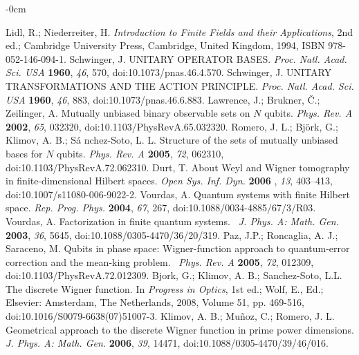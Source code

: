 \documentclass[quantumrep,article,submit,pdftex,moreauthors]{Definitions/mdpi}
\begin{document}
\begin{adjustwidth}{-\extralength}{0cm}
\begin{thebibliography}{999}
 Lidl, R.; Niederreiter, H. \textit{Introduction to Finite
Fields and their Applications}, 2nd ed.; Cambridge University Press,
Cambridge, United Kingdom, 1994, ISBN 978-052-146-094-1.
 Schwinger, J. UNITARY OPERATOR BASES. \textit{Proc.
Natl. Acad. Sci. USA} \textbf{1960}, \textit{46}, 570,
doi:10.1073/pnas.46.4.570.
 Schwinger, J. UNITARY TRANSFORMATIONS AND THE ACTION
PRINCIPLE. \textit{Proc. Natl. Acad. Sci. USA} \textbf{1960}, \textit{46},
883, doi:10.1073/pnas.46.6.883.
 Lawrence, J.; Brukner, \v{C}.; Zeilinger, A. Mutually
unbiased binary observable sets on $N$ qubits. \textit{Phys. Rev. A} \textbf{%
2002}, \textit{65}, 032320, doi:10.1103/PhysRevA.65.032320.
 Romero, J. L.; Bj\"{o}rk, G.; Klimov, A. B.; S\'{a}%
nchez-Soto, L. L. Structure of the sets of mutually unbiased bases for $N$
qubits. \textit{Phys. Rev. A} \textbf{2005}, \textit{72}, 062310,
doi:10.1103/PhysRevA.72.062310.
 Durt, T. About Weyl and Wigner tomography in
finite-dimensional Hilbert spaces. \textit{Open Sys. Inf. Dyn.} \textbf{2006}%
, \textit{13}, 403--413, doi:10.1007/s11080-006-9022-2.
 Vourdas, A. Quantum systems with finite Hilbert space. 
\textit{Rep. Prog. Phys.} \textbf{2004}, \textit{67}, 267,
doi:10.1088/0034-4885/67/3/R03.
 Vourdas, A. Factorization in finite quantum systems. 
\textit{\ J. Phys. A: Math. Gen.} \textbf{2003}, \textit{36}, 5645,
doi:10.1088/0305-4470/36/20/319.
 Paz, J.P.; Roncaglia, A. J.; Saraceno, M. Qubits in phase
space: Wigner-function approach to quantum-error correction and the
mean-king problem. \textit{\ Phys. Rev. A} \textbf{2005}, \textit{72},
012309, doi:10.1103/PhysRevA.72.012309.
 Bjork, G.; Klimov, A. B.; Sanchez-Soto, L.L. The discrete
Wigner function. In \textit{Progress in Optics}, 1st ed.; Wolf, E., Ed.;
Elsevier: Amsterdam, The Netherlands, 2008, Volume 51, pp. 469-516,
doi:10.1016/S0079-6638(07)51007-3.
 Klimov, A. B.; Mu\~{n}oz, C.; Romero, J. L. Geometrical
approach to the discrete Wigner function in prime power dimensions. \textit{%
J. Phys. A: Math. Gen.} \textbf{2006}, \textit{39}, 14471,
doi:10.1088/0305-4470/39/46/016.
\end{thebibliography}

%


\end{adjustwidth}
\end{document}
